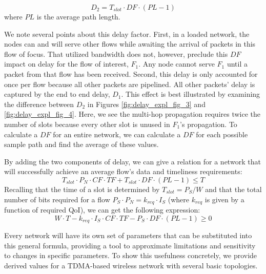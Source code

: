 \begin{equation}
	D_2 = T_{slot} \cdot DF \cdot (PL - 1)
\end{equation}
where $PL$ is the average path length.

We note several points about this delay factor.  First, in a loaded network, the nodes can and will serve other flows while awaiting the arrival of packets in this flow of focus.  That utilized bandwidth does not, however, preclude this $DF$ impact on delay for the flow of interest, $F_1$.  Any node cannot serve $F_1$ until a packet from that flow has been received.  Second, this delay is only accounted for once per flow because all other packets are pipelined.  All other packets' delay is captured by the end to end delay, $D_1$.  This effect is best illustrated by examining the difference between $D_2$ in Figures \ref{fig:delay_expl_fig_3} and \ref{fig:delay_expl_fig_4}.  Here, we see the multi-hop propagation requires twice the number of slots because every other slot is unused in $F_1$'s propagation.  
To calculate a $DF$ for an entire network, we can calculate a $DF$ for each possible sample path and find the average of these values.  %

By adding the two components of delay, we can give a relation for a network that will successfully achieve an average flow's data and timeliness requirements:
\begin{equation*}
	T_{slot} \cdot P_N \cdot CF \cdot TF + T_{slot} \cdot DF \cdot (PL-1) \leq T
\end{equation*}
Recalling that the time of a slot is determined by %
$T_{slot} = P_S/W$ %
and that the total number of bits required for a flow $P_S \cdot P_N =  k_{req} \cdot I_S$ (where $k_{req}$ is given by a function of required QoI), we can get the following expression:
\begin{equation}
	W \cdot T - k_{req} \cdot I_S \cdot CF \cdot TF - P_S \cdot DF \cdot (PL-1) \geq 0	
	\label{eq:general_scal}
\end{equation}

Every network will have its own set of parameters that can be substituted into this general formula, providing a tool to approximate limitations and sensitivity to changes in specific parameters.  To show this usefulness concretely, we provide derived values for a TDMA-based wireless network with several basic topologies.



